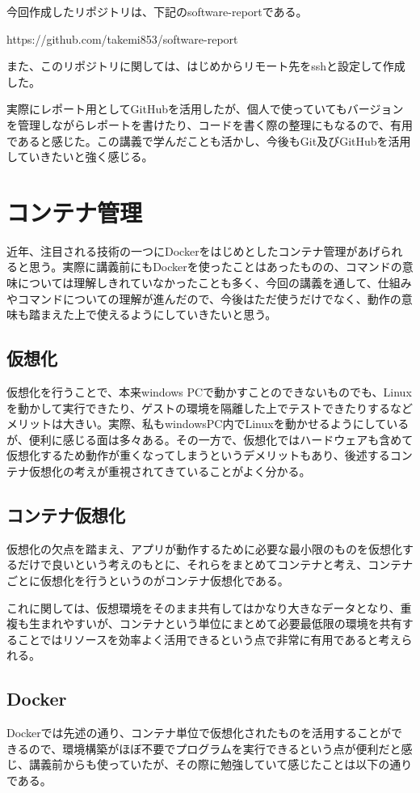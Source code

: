 \documentclass[12pt]{jsarticle}
\begin{document}
今回作成したリポジトリは、下記のsoftware-reportである。

https://github.com/takemi853/software-report

また、このリポジトリに関しては、はじめからリモート先をsshと設定して作成した。

実際にレポート用としてGitHubを活用したが、個人で使っていてもバージョンを管理しながらレポートを書けたり、コードを書く際の整理にもなるので、有用であると感じた。この講義で学んだことも活かし、今後もGit及びGitHubを活用していきたいと強く感じる。

\newpage
\section{コンテナ管理}
近年、注目される技術の一つにDockerをはじめとしたコンテナ管理があげられると思う。実際に講義前にもDockerを使ったことはあったものの、コマンドの意味については理解しきれていなかったことも多く、今回の講義を通して、仕組みやコマンドについての理解が進んだので、今後はただ使うだけでなく、動作の意味も踏まえた上で使えるようにしていきたいと思う。

\subsection{仮想化}
仮想化を行うことで、本来windows PCで動かすことのできないものでも、Linuxを動かして実行できたり、ゲストの環境を隔離した上でテストできたりするなどメリットは大きい。実際、私もwindowsPC内でLinuxを動かせるようにしているが、便利に感じる面は多々ある。その一方で、仮想化ではハードウェアも含めて仮想化するため動作が重くなってしまうというデメリットもあり、後述するコンテナ仮想化の考えが重視されてきていることがよく分かる。

\subsection{コンテナ仮想化}
仮想化の欠点を踏まえ、アプリが動作するために必要な最小限のものを仮想化するだけで良いという考えのもとに、それらをまとめてコンテナと考え、コンテナごとに仮想化を行うというのがコンテナ仮想化である。

これに関しては、仮想環境をそのまま共有してはかなり大きなデータとなり、重複も生まれやすいが、コンテナという単位にまとめて必要最低限の環境を共有することではリソースを効率よく活用できるという点で非常に有用であると考えられる。

\subsection{Docker}
Dockerでは先述の通り、コンテナ単位で仮想化されたものを活用することができるので、環境構築がほぼ不要でプログラムを実行できるという点が便利だと感じ、講義前からも使っていたが、その際に勉強していて感じたことは以下の通りである。
\end{document}
